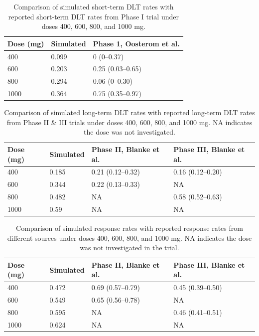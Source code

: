 \documentclass[11pt]{article}
\begin{document}
\begin{table}[htbp]
\centering
\caption{Comparison of simulated short-term DLT rates with reported short-term DLT rates from Phase I trial under doses 400, 600, 800, and 1000 mg.}
\label{Imatinib_ST_DLT_comparison}
\begin{tabular}{lll}
\toprule
\textbf{Dose (mg)} & \textbf{Simulated} & \textbf{Phase 1, Oosterom et al.} \\
\midrule
400  & 0.099 & 0 (0--0.37) \\
600  & 0.203 & 0.25 (0.03--0.65) \\
800  & 0.294 & 0.06 (0--0.30) \\
1000 & 0.364 & 0.75 (0.35--0.97) \\
\bottomrule
\end{tabular}
\end{table}

\begin{table}[htbp]
\centering
\caption{Comparison of simulated long-term DLT rates with reported long-term DLT rates from Phase II \& III trials under doses 400, 600, 800, and 1000 mg. NA indicates the dose was not investigated.}
\label{Imatinib_LT_DLT_comparison}
\begin{tabular}{llll}
\toprule
\textbf{Dose (mg)} & \textbf{Simulated} & \textbf{Phase II, Blanke et al.} & \textbf{Phase III, Blanke et al.} \\
\midrule
400  & 0.185 & 0.21 (0.12--0.32) & 0.16 (0.12--0.20) \\
600  & 0.344 & 0.22 (0.13--0.33) & NA \\
800  & 0.482 & NA & 0.58 (0.52--0.63) \\
1000 & 0.59  & NA & NA \\
\bottomrule
\end{tabular}
\end{table}

\begin{table}[htbp]
\centering
\caption{Comparison of simulated response rates with reported response rates from different sources under doses 400, 600, 800, and 1000 mg. NA indicates the dose was not investigated in the trial.}
\label{Imatinib_TRR_comparison}
\begin{tabular}{llll}
\toprule
\textbf{Dose (mg)} & \textbf{Simulated} & \textbf{Phase II, Blanke et al.} & \textbf{Phase III, Blanke et al.} \\
\midrule
400  & 0.472 & 0.69 (0.57--0.79) & 0.45 (0.39--0.50) \\
600  & 0.549 & 0.65 (0.56--0.78) & NA \\
800  & 0.595 & NA & 0.46 (0.41--0.51) \\
1000 & 0.624 & NA & NA \\
\bottomrule
\end{tabular}
\end{table}
\end{document}
